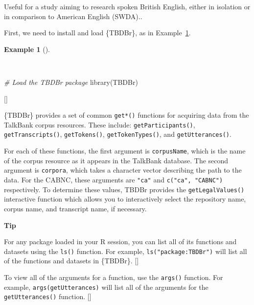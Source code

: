 \documentclass[
  letterpaper,
  krantz1]{latex/krantz-mod}
\newenvironment{Shaded}{\begin{snugshade}}{\end{snugshade}}
\newcommand{\CommentTok}[1]{\textcolor[rgb]{0.00,0.00,0.00}{\textit{#1}}}
\newcommand{\FunctionTok}[1]{\textcolor[rgb]{0.00,0.00,0.00}{#1}}
\newcommand{\NormalTok}[1]{\textcolor[rgb]{0.00,0.00,0.00}{#1}}
\newcommand{\cindex}[1]{%
  \StrSubstitute{#1}{_}{\_}[\temp]%
  \index{\temp}%
}
\theoremstyle{definition}
\theoremstyle{definition}
\newtheorem{example}{Example}[chapter]
\theoremstyle{remark}
\begin{document}
Useful for a study aiming to research spoken British English, either in
isolation or in comparison to American English
(SWDA)..

First, we need to install and load \{TBDBr\}, as in
Example~\ref{exm-acquire-load-pacman}.

\begin{example}[]\protect\hypertarget{exm-acquire-load-pacman}{}\label{exm-acquire-load-pacman}

~

\begin{Shaded}
\begin{Highlighting}[numbers=left,,]
\CommentTok{\# Load the TBDBr package}
\FunctionTok{library}\NormalTok{(TBDBr)}
\end{Highlighting}
\end{Shaded}

\cindex{library()}

\end{example}

\{TBDBr\} provides a set of common \texttt{get*()} functions for
acquiring data from the TalkBank corpus resources. These include:
\texttt{getParticipants()}, \texttt{getTranscripts()},
\texttt{getTokens()}, \texttt{getTokenTypes()}, and
\texttt{getUtterances()}.

For each of these functions, the first argument is \texttt{corpusName},
which is the name of the corpus resource as it appears in the TalkBank
database. The second argument is \texttt{corpora}, which takes a
character vector describing the path to the data. For the CABNC, these
arguments are \texttt{"ca"} and \texttt{c("ca",\ "CABNC")} respectively.
To determine these values, TBDBr provides the \texttt{getLegalValues()}
interactive function which allows you to interactively select the
repository name, corpus name, and transcript name, if necessary.

\begin{tcolorbox}[enhanced jigsaw, toprule=.15mm, breakable, colback=white, arc=.35mm, left=2mm, colframe=quarto-callout-color-frame, opacityback=0, bottomrule=.15mm, rightrule=.15mm, leftrule=.75mm]

\textbf{ Tip}

For any package loaded in your R session, you can list all of its
functions and datasets using the \texttt{ls()} function. For example,
\texttt{ls("package:TBDBr")} will list all of the functions and datasets
in \{TBDBr\}.\cindex{ls()}

To view all of the arguments for a function, use the \texttt{args()}
function. For example, \texttt{args(getUtterances)} will list all of the
arguments for the \texttt{getUtterances()} function.\cindex{args()}

\end{tcolorbox}
\end{document}
